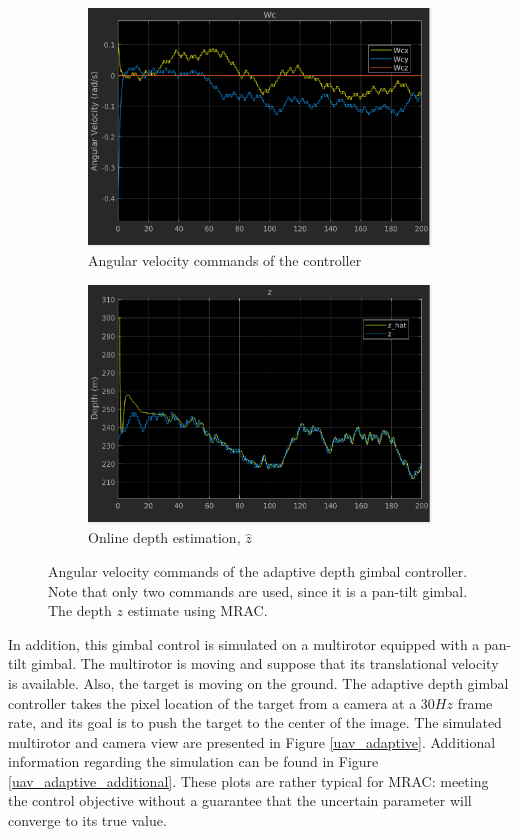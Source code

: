\begin{figure}[htbp]
	\centering
	\begin{subfigure}{0.5\textwidth}
		\centering
		\includegraphics[width=0.9\linewidth]{images/chapter2/angular_velocity_adaptive}
		\caption{Angular velocity commands of the controller}
	\end{subfigure}%
	\begin{subfigure}{0.5\textwidth}
		\centering
		\includegraphics[width=0.9\linewidth]{images/chapter2/z_adaptive}
		\caption{Online depth estimation, $\hat{z}$}
	\end{subfigure}
	\caption{Angular velocity commands of the adaptive depth gimbal controller. Note that only two commands are used, since it is a pan-tilt gimbal. The depth $z$ estimate using MRAC.}
	\label{adaptive_command}
\end{figure}

In addition, this gimbal control is simulated on a multirotor equipped with a pan-tilt gimbal. The multirotor is moving and suppose that its translational velocity is available. Also, the target is moving on the ground. The adaptive depth gimbal controller takes the pixel location of the target from a camera at a $30Hz$ frame rate, and its goal is to push the target to the center of the image. The simulated multirotor and camera view are presented in Figure \ref{uav_adaptive}. Additional information regarding the simulation can be found in Figure \ref{uav_adaptive_additional}. These plots are rather typical for MRAC: meeting the control objective without a guarantee that the uncertain parameter will converge to its true value. 

